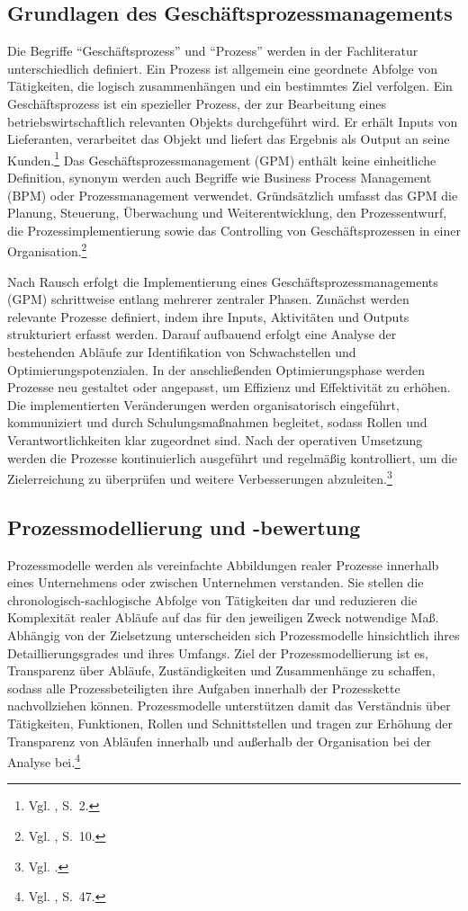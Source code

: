 \documentclass[
    12pt, 
    a4paper,
    ]{scrartcl} %
\begin{document}
\subsection{Grundlagen des Geschäftsprozessmanagements}
Die Begriffe \enquote{Geschäftsprozess} und \enquote{Prozess} werden in der Fachliteratur unterschiedlich definiert. Ein Prozess ist allgemein eine geordnete Abfolge von Tätigkeiten, die logisch zusammenhängen und ein bestimmtes Ziel verfolgen. Ein Geschäftsprozess ist ein spezieller Prozess, der zur Bearbeitung eines betriebswirtschaftlich relevanten Objekts durchgeführt wird. Er erhält Inputs von Lieferanten, verarbeitet das Objekt und liefert das Ergebnis als Output an seine Kunden.\footnote{Vgl. \cite{Koch_Geschaeftsprozessmanagement}, S.~2.} Das Geschäftsprozessmanagement (GPM) enthält keine einheitliche Definition, synonym werden auch Begriffe wie Business Process Management (BPM) oder Prozessmanagement verwendet. Gründsätzlich umfasst das GPM die Planung, Steuerung, Überwachung und Weiterentwicklung, den Prozessentwurf, die Prozessimplementierung sowie das Controlling von Geschäftsprozessen in einer Organisation.\footnote{Vgl. \cite{Koch_Geschaeftsprozessmanagement}, S.~10.}

Nach Rausch erfolgt die Implementierung eines Geschäftsprozessmanagements (GPM) schrittweise entlang mehrerer zentraler Phasen. Zunächst werden relevante Prozesse definiert, indem ihre Inputs, Aktivitäten und Outputs strukturiert erfasst werden. Darauf aufbauend erfolgt eine Analyse der bestehenden Abläufe zur Identifikation von Schwachstellen und Optimierungspotenzialen. In der anschließenden Optimierungsphase werden Prozesse neu gestaltet oder angepasst, um Effizienz und Effektivität zu erhöhen. Die implementierten Veränderungen werden organisatorisch eingeführt, kommuniziert und durch Schulungsmaßnahmen begleitet, sodass Rollen und Verantwortlichkeiten klar zugeordnet sind. Nach der operativen Umsetzung werden die Prozesse kontinuierlich ausgeführt und regelmäßig kontrolliert, um die Zielerreichung zu überprüfen und weitere Verbesserungen abzuleiten.\footnote{Vgl. \cite{Boc_Group}.}

\subsection{Prozessmodellierung und -bewertung}
Prozessmodelle werden als vereinfachte Abbildungen realer Prozesse innerhalb eines Unternehmens oder zwischen Unternehmen verstanden. Sie stellen die chronologisch-sachlogische Abfolge von Tätigkeiten dar und reduzieren die Komplexität realer Abläufe auf das für den jeweiligen Zweck notwendige Maß. Abhängig von der Zielsetzung unterscheiden sich Prozessmodelle hinsichtlich ihres Detaillierungsgrades und ihres Umfangs. Ziel der Prozessmodellierung ist es, Transparenz über Abläufe, Zuständigkeiten und Zusammenhänge zu schaffen, sodass alle Prozessbeteiligten ihre Aufgaben innerhalb der Prozesskette nachvollziehen können. Prozessmodelle unterstützen damit das Verständnis über Tätigkeiten, Funktionen, Rollen und Schnittstellen und tragen zur Erhöhung der Transparenz von Abläufen innerhalb und außerhalb der Organisation bei der Analyse bei.\footnote{Vgl. \cite{Koch_Geschaeftsprozessmanagement}, S.~47.}
\end{document}
